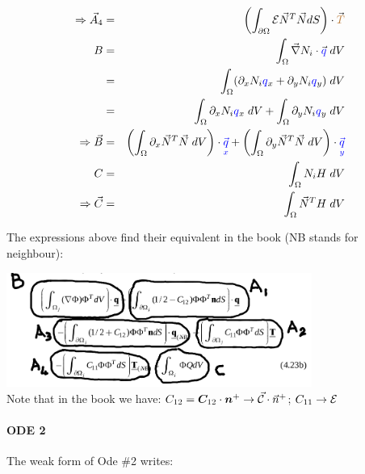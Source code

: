 \begin{eqnarray}
\Rightarrow {\vec A}_4 &=&  \left( \int_{\partial\Omega}   {\cal{E}}   \vec{N}^T \vec{N} dS \right) \cdot \vec{{\color{brown} T}} \\ 
B 
&=& \int_{\Omega} \vec{\nabla} {N_i} \cdot \vec{\color{blue} q} \; dV  \nonumber \\
&=& \int_{\Omega} (\partial_x N_i {\color{blue}q}_x + \partial_y N_i {\color{blue}q}_y )   \; dV  \nonumber \\
&=& \int_{\Omega} \partial_x N_i {\color{blue}q}_x   \; dV   
 +  \int_{\Omega} \partial_y N_i {\color{blue}q}_y   \; dV  \nonumber \\
\Rightarrow {\vec B} &=& 
  \left(\int_{\Omega} \partial_x \vec{N}^T \vec{N}   \; dV \right)\cdot {\color{blue}\vec{\underset{\tiny x}{q}}}  
+ \left(\int_{\Omega} \partial_y \vec{N}^T \vec{N}   \; dV \right)\cdot {\color{blue}\vec{\underset{\tiny y}{q}}}  \\
C &=& \int_{\Omega} {N_i} H  \;dV \nonumber \\
\Rightarrow {\vec C} &=& \int_{\Omega} \vec{N}^T H  \;dV  
\end{eqnarray}


The expressions above find their equivalent in the book (NB stands for neighbour):
\begin{center}
\includegraphics[width=10cm]{images/dgfem/li_01}\\
{\captionfont Note that in the book we have: $C_{12}={\bm C}_{12}\cdot {\bm n}^+ \rightarrow \vec{\cal C}\cdot\vec{n}^+$;
$C_{11} \rightarrow {\cal E}$}
\end{center}





\paragraph{ODE 2} The weak form of Ode \#2 writes:

